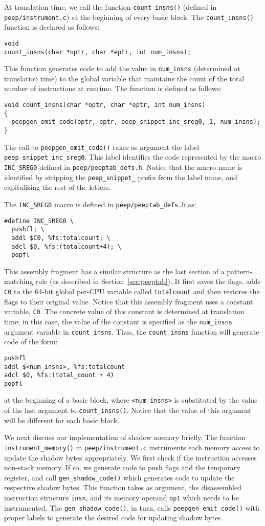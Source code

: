 \documentclass[9pt]{article}
\begin{document}
At translation time, we call the function {\tt count\_insns()} (defined
in {\tt peep/instrument.c}) at the beginning of every basic block. The
{\tt count\_insns()} function is declared as follows:
\begin{verbatim}
void
count_insns(char *optr, char *eptr, int num_insns);
\end{verbatim}
This function generates code to add the value in {\tt num\_insns} (determined
at translation time) to the global variable that maintains the count of the
total number of instructions at runtime. The function is defined as
follows:
\begin{verbatim}
void count_insns(char *optr, char *eptr, int num_insns)
{
  peepgen_emit_code(optr, eptr, peep_snippet_inc_sreg0, 1, num_insns);
}
\end{verbatim}
The call to {\tt peepgen\_emit\_code()} takes as argument the label
{\tt peep\_snippet\_inc\_sreg0}. This label identifies the code represented
by the macro {\tt INC\_SREG0} defined in {\tt peep/peeptab\_defs.h}. Notice
that the macro name is identified by stripping the {\tt peep\_snippet\_}
prefix from the label name, and capitalizing the rest of the letters.

The {\tt INC\_SREG0} macro is defined in {\tt peep/peeptab\_defs.h} as:
\begin{verbatim}
#define INC_SREG0 \
  pushfl; \
  addl $C0, %fs:totalcount; \
  adcl $0, %fs:(totalcount+4); \
  popfl
\end{verbatim}
This assembly fragment has a similar structure as the last section of a
pattern-matching rule (as described in Section~\ref{sec:peeptab}). It
first saves the flags, adds {\tt C0} to the 64-bit global per-CPU variable
called {\tt totalcount} and then restores the flags to their original value.
Notice that this assembly fragment uses a constant variable, {\tt C0}.
The concrete value of this constant is determined at translation time; in
this case, the value of the constant is specified as the {\tt num\_insns}
argument variable in {\tt count\_insns}. Thus, the {\tt count\_insns} function
will generate code of the form:
\begin{verbatim}
pushfl
addl $<num_insns>, %fs:totalcount
adcl $0, %fs:(total_count + 4)
popfl
\end{verbatim}
at the beginning of a basic block, where {\tt <num\_insns>} is substituted
by the value of the last argument to {\tt count\_insns()}. Notice that the
value of this argument will be different for each basic block.

We next discuss our implementation of shadow memory briefly. The function
{\tt instrument\_memory()} in {\tt peep/instrument.c} instruments
each memory access to update the shadow bytes appropriately. We first
check if the instruction accesses non-stack memory. If so, we generate
code to push flags and the temporary register, and
call {\tt gen\_shadow\_code()} which generates code to update the
respective shadow bytes. This function takes as argument, the disassembled
instruction structure {\tt insn}, and its memory operand {\tt op1} which
needs to be instrumented. The {\tt gen\_shadow\_code()}, in turn, calls
{\tt peepgen\_emit\_code()} with proper labels to generate the desired
code for updating shadow bytes.
\end{document}
